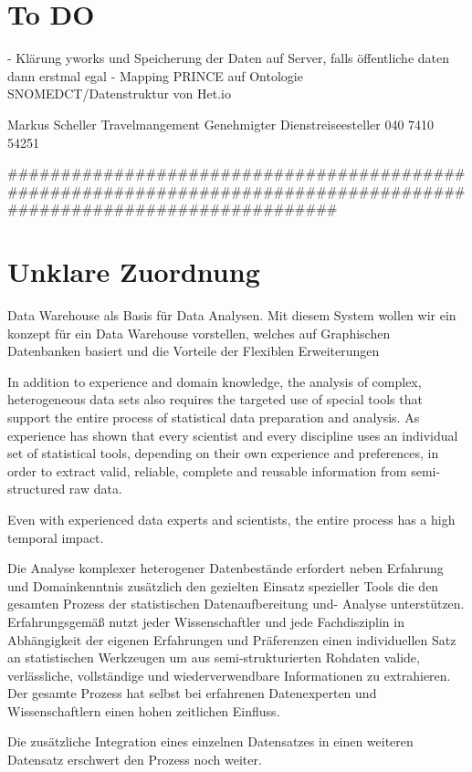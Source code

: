 \section{To DO}
 - Klärung yworks und Speicherung der Daten auf Server, falls öffentliche daten dann erstmal egal
 - Mapping PRINCE auf Ontologie SNOMEDCT/Datenstruktur von Het.io
 
 
Markus Scheller Travelmangement
Genehmigter Dienstreiseesteller
040 7410 54251

#####################################################################################################################

\section{Unklare Zuordnung}
Data Warehouse als Basis für Data Analysen. Mit diesem System wollen wir ein konzept für ein Data Warehouse vorstellen, welches auf Graphischen Datenbanken basiert und die Vorteile der Flexiblen Erweiterungen 


In addition to experience and domain knowledge, the analysis of complex, heterogeneous data sets also requires the targeted use of special tools that support the entire process of statistical data preparation and analysis. As experience has shown that every scientist and every discipline uses an individual set of statistical tools, depending on their own experience and preferences, in order to extract valid, reliable, complete and reusable information from semi-structured raw data. 


Even with experienced data experts and scientists, the entire process has a high temporal impact.

Die Analyse komplexer heterogener Datenbestände erfordert neben Erfahrung und Domainkenntnis zusätzlich den gezielten Einsatz spezieller Tools die den gesamten Prozess der statistischen Datenaufbereitung und- Analyse unterstützen. Erfahrungsgemäß nutzt jeder Wissenschaftler und jede Fachdisziplin in Abhängigkeit der eigenen Erfahrungen und Präferenzen einen individuellen Satz an statistischen Werkzeugen um aus semi-strukturierten Rohdaten valide, verlässliche, vollständige und wiederverwendbare Informationen zu extrahieren. Der gesamte Prozess hat selbst bei erfahrenen Datenexperten und Wissenschaftlern einen hohen zeitlichen Einfluss. 

Die zusätzliche Integration eines einzelnen Datensatzes in einen weiteren Datensatz erschwert den Prozess noch weiter.

